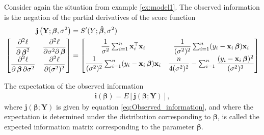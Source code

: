 \begin{example} \label{ex:Observed_information}
    Consider again the situation from example \ref{ex:model1}. The observed information is the negation of the partial derivatives of the score function
    \begin{align*}
         \textbf{j}\left( \textbf{Y}; \boldsymbol{\beta}, \sigma^2 \right) &= S'(Y; \operatorname{\boldsymbol{\hat{\beta}}}, \sigma^2) \\
         \begin{bmatrix}
            \dfrac{\partial^2 \ell}{\partial \operatorname{\boldsymbol{\beta}}^2} & \dfrac{\partial^2 \ell}{\partial \sigma^2 \partial \operatorname{\boldsymbol{\beta}}} \\
            \dfrac{\partial^2 \ell}{\partial \operatorname{\boldsymbol{\beta}} \partial \sigma^2} & \dfrac{\partial^2 \ell}{\partial (\sigma^2)^2}
         \end{bmatrix}
         &=
         \begin{bmatrix}
            \dfrac{1}{\sigma^2} \sum_{i=1}^n \textbf{x}_i^\top \textbf{x}_i & \dfrac{1}{(\sigma^2)^2} \sum_{i=1}^n (y_i - \textbf{x}_i \operatorname{\boldsymbol{\beta}}) \textbf{x}_i \\
            \dfrac{1}{(\sigma^2)^2} \sum_{i=1}^n (y_i - \textbf{x}_i \operatorname{\boldsymbol{\beta}}) \textbf{x}_i & \dfrac{n}{4 (\sigma^2)^2} - \sum_{i=1}^n \dfrac{(y_i - \textbf{x}_i \operatorname{\boldsymbol{\beta}})^2}{(\sigma^2)^3}
         \end{bmatrix}
    \end{align*}
\end{example}

\begin{definition} 
\label{def:expected_information}
The expectation of the observed information 
\begin{align}
    \textbf{i}(\boldsymbol{\beta}) = E[\textbf{j}(\boldsymbol{\beta};\textbf{Y})],
\end{align}
where $\textbf{j}(\boldsymbol{\beta};\textbf{Y})$ is given by equation \eqref{eq:Observed_information}, and where the expectation is determined under the distribution corresponding to $\boldsymbol{\beta}$, is called the expected information matrix corresponding to the parameter $\boldsymbol{\beta}$.
\end{definition}

